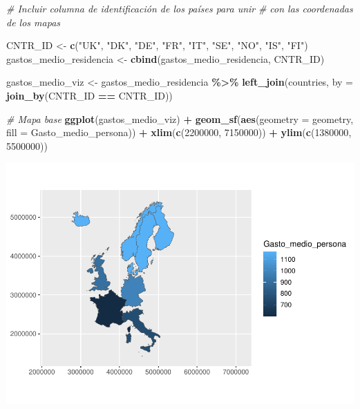 \documentclass[data,article,submit,moreauthors,pdftex]{Definitions/mdpi}
\newenvironment{Shaded}{\begin{snugshade}}{\end{snugshade}}
\newcommand{\AttributeTok}[1]{\textcolor[rgb]{0.13,0.29,0.53}{#1}}
\newcommand{\CommentTok}[1]{\textcolor[rgb]{0.56,0.35,0.01}{\textit{#1}}}
\newcommand{\DecValTok}[1]{\textcolor[rgb]{0.00,0.00,0.81}{#1}}
\newcommand{\FunctionTok}[1]{\textcolor[rgb]{0.13,0.29,0.53}{\textbf{#1}}}
\newcommand{\NormalTok}[1]{#1}
\newcommand{\OtherTok}[1]{\textcolor[rgb]{0.56,0.35,0.01}{#1}}
\newcommand{\SpecialCharTok}[1]{\textcolor[rgb]{0.81,0.36,0.00}{\textbf{#1}}}
\newcommand{\StringTok}[1]{\textcolor[rgb]{0.31,0.60,0.02}{#1}}
\begin{document}
\begin{Shaded}
\begin{Highlighting}[]
\CommentTok{\# Incluir columna de identificación de los países para unir}
\CommentTok{\# con las coordenadas de los mapas}

\NormalTok{CNTR\_ID }\OtherTok{\textless{}{-}} \FunctionTok{c}\NormalTok{(}\StringTok{"UK"}\NormalTok{, }\StringTok{"DK"}\NormalTok{, }\StringTok{"DE"}\NormalTok{, }\StringTok{"FR"}\NormalTok{, }\StringTok{"IT"}\NormalTok{, }\StringTok{"SE"}\NormalTok{, }\StringTok{"NO"}\NormalTok{, }\StringTok{"IS"}\NormalTok{,}
    \StringTok{"FI"}\NormalTok{)}
\NormalTok{gastos\_medio\_residencia }\OtherTok{\textless{}{-}} \FunctionTok{cbind}\NormalTok{(gastos\_medio\_residencia, CNTR\_ID)}


\NormalTok{gastos\_medio\_viz }\OtherTok{\textless{}{-}}\NormalTok{ gastos\_medio\_residencia }\SpecialCharTok{\%\textgreater{}\%}
    \FunctionTok{left\_join}\NormalTok{(countries, }\AttributeTok{by =} \FunctionTok{join\_by}\NormalTok{(CNTR\_ID }\SpecialCharTok{==}\NormalTok{ CNTR\_ID))}



\CommentTok{\# Mapa base}
\FunctionTok{ggplot}\NormalTok{(gastos\_medio\_viz) }\SpecialCharTok{+} \FunctionTok{geom\_sf}\NormalTok{(}\FunctionTok{aes}\NormalTok{(}\AttributeTok{geometry =}\NormalTok{ geometry, }\AttributeTok{fill =}\NormalTok{ Gasto\_medio\_persona)) }\SpecialCharTok{+}
    \FunctionTok{xlim}\NormalTok{(}\FunctionTok{c}\NormalTok{(}\DecValTok{2200000}\NormalTok{, }\DecValTok{7150000}\NormalTok{)) }\SpecialCharTok{+} \FunctionTok{ylim}\NormalTok{(}\FunctionTok{c}\NormalTok{(}\DecValTok{1380000}\NormalTok{, }\DecValTok{5500000}\NormalTok{))}
\end{Highlighting}
\end{Shaded}

\includegraphics{ProyectoAED2024_Rmd_files/figure-latex/unnamed-chunk-26-1.pdf}
\end{document}
